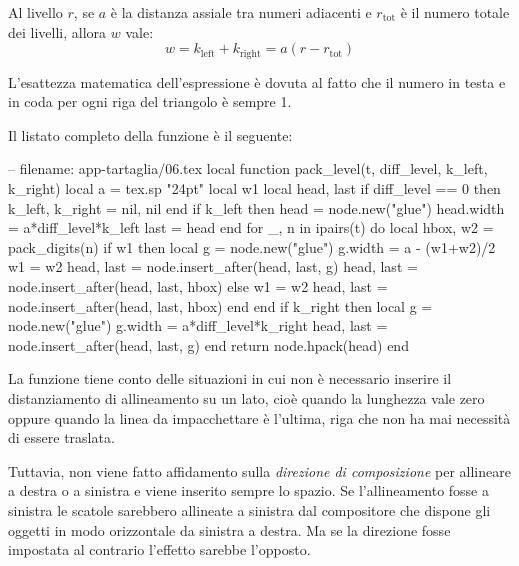 Al livello \( r \), se \( a \) è la distanza assiale tra numeri adiacenti e \(
r_\mathrm{tot} \) è il numero totale dei livelli, allora \( w \) vale:
\[
w = k_\mathrm{left} + k_\mathrm{right} = a\left(r - r_\mathrm{tot}\right)
\]

L'esattezza matematica dell'espressione è dovuta al fatto che il numero in testa
e in coda per ogni riga del triangolo è sempre 1.

Il listato completo della funzione  è il seguente:
\begin{lines}
-- filename: app-tartaglia/06.tex
local function pack_level(t, diff_level, k_left, k_right)
    local a = tex.sp "24pt"
    local w1
    local head, last
    if diff_level == 0 then
        k_left, k_right = nil, nil
    end
    if k_left then
        head = node.new("glue")
        head.width = a*diff_level*k_left
        last = head
    end
    for _, n in ipairs(t) do
        local hbox, w2 = pack_digits(n)
        if w1 then
            local g = node.new("glue")
            g.width = a - (w1+w2)/2
            w1 = w2
            head, last = node.insert_after(head, last, g)
            head, last = node.insert_after(head, last, hbox)
        else
            w1 = w2
            head, last = node.insert_after(head, last, hbox)
        end
    end
    if k_right then
        local g = node.new("glue")
        g.width = a*diff_level*k_right
        head, last = node.insert_after(head, last, g)
    end
    return node.hpack(head)
end
\end{lines}

La funzione tiene conto delle situazioni in cui non è necessario inserire il
distanziamento di allineamento su un lato, cioè quando la lunghezza vale zero
oppure quando la linea da impacchettare è l'ultima, riga che non ha mai
necessità di essere traslata.

Tuttavia, non viene fatto affidamento sulla \emph{direzione di composizione} per
allineare a destra o a sinistra e viene inserito sempre lo spazio. Se
l'allineamento fosse a sinistra le scatole sarebbero allineate a sinistra dal
compositore che dispone gli oggetti in modo orizzontale da sinistra a destra. Ma
se la direzione fosse impostata al contrario l'effetto sarebbe l'opposto.

